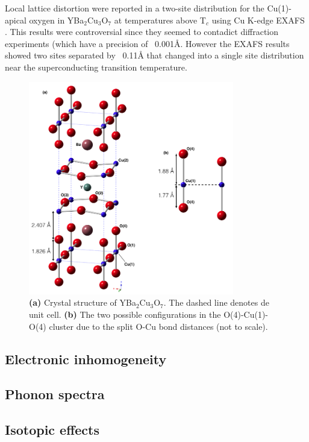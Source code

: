 Local lattice distortion were reported in a two-site distribution for the Cu(1)-apical oxygen in YBa$_{2}$Cu$_{3}$O$_{7}$  at temperatures above T$_{c}$ using Cu K-edge EXAFS\cite{MustredeLeon1990} \cite{Conradson1990}. This results were controversial\cite{Kwei1990} since they seemed to contadict diffraction experiments (which have a precision of ~0.001Å\cite{Miceli1988}. However the EXAFS results showed two sites separated by ~0.11Å that changed into a single site distribution near the superconducting transition temperature.

\begin{figure}[ht!]
\centering
\includegraphics[width=0.8\textwidth]{images/YBCO_O-Cu-Ov2.jpg}
\caption{\textbf{(a)} Crystal structure of YBa$_{2}$Cu$_{3}$O$_{7}$. The dashed line denotes de unit cell. \textbf{(b)} The two possible configurations in the O(4)-Cu(1)-O(4) cluster due to the split O-Cu bond distances (not to scale).
}
\label{fig:YBCO_structure}
\end{figure}


\subsection{Electronic inhomogeneity}
\subsection{Phonon spectra}
\subsection{Isotopic effects}

